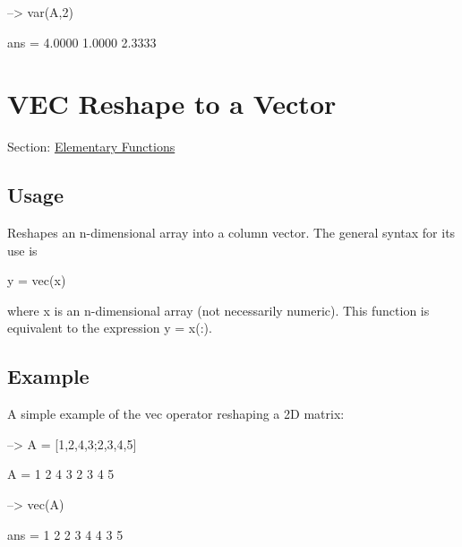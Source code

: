 \begin{DoxyVerbInclude}
--> var(A,2)

ans = 
    4.0000 
    1.0000 
    2.3333 
\end{DoxyVerbInclude}
 \hypertarget{elementary_vec}{}\section{V\-E\-C Reshape to a Vector}\label{elementary_vec}
Section\-: \hyperlink{sec_elementary}{Elementary Functions} \hypertarget{vtkwidgets_vtkxyplotwidget_Usage}{}\subsection{Usage}\label{vtkwidgets_vtkxyplotwidget_Usage}
Reshapes an n-\/dimensional array into a column vector. The general syntax for its use is \begin{DoxyVerb}   y = vec(x)
\end{DoxyVerb}
 where {\ttfamily x} is an n-\/dimensional array (not necessarily numeric). This function is equivalent to the expression {\ttfamily y = x(\-:)}. \hypertarget{variables_struct_Example}{}\subsection{Example}\label{variables_struct_Example}
A simple example of the {\ttfamily vec} operator reshaping a 2\-D matrix\-:


\begin{DoxyVerbInclude}
--> A = [1,2,4,3;2,3,4,5]

A = 
 1 2 4 3 
 2 3 4 5 

--> vec(A)

ans = 
 1 
 2 
 2 
 3 
 4 
 4 
 3 
 5 
\end{DoxyVerbInclude}
 